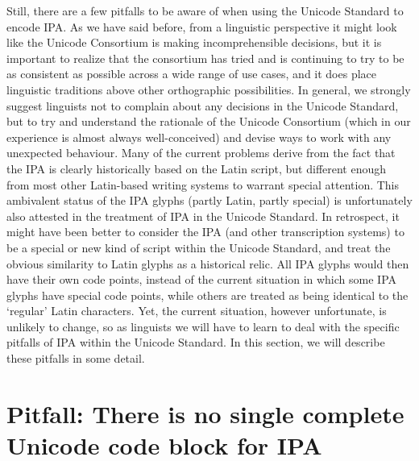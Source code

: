 Still, there are a few pitfalls to be aware of when using the Unicode Standard to encode IPA. As we have said before, from a linguistic perspective it might look like the Unicode Consortium is making incomprehensible decisions, but it is important to realize that the consortium has tried and is continuing to try to be as consistent as possible across a wide range of use cases, and it does place linguistic traditions above other orthographic possibilities. In general, we strongly suggest linguists not to complain about any decisions in the Unicode Standard, but to try and understand the rationale of the Unicode Consortium (which in our experience is almost always well-conceived) and devise ways to work with any unexpected behaviour. Many of the current problems derive from the fact that the IPA is clearly historically based on the Latin script, but different enough from most other Latin-based writing systems to warrant special attention. This ambivalent status of the IPA glyphs (partly Latin, partly special) is unfortunately also attested in the treatment of IPA in the Unicode Standard. In retrospect, it might have been better to consider the IPA (and other transcription systems) to be a special or new kind of script within the Unicode Standard, and treat the obvious similarity to Latin glyphs as a historical relic. All IPA glyphs would then have their own code points, instead of the current situation in which some IPA glyphs have special code points, while others are treated as being identical to the `regular' Latin characters. Yet, the current situation, however unfortunate, is unlikely to change, so as linguists we will have to learn to deal with the specific pitfalls of IPA within the Unicode Standard. In this section, we will describe these pitfalls in some detail.

\section{Pitfall: There is no single complete Unicode code block for IPA}
\label{pitfall-there-is-no-single-complete-unicode-code-block-for-ipa}

